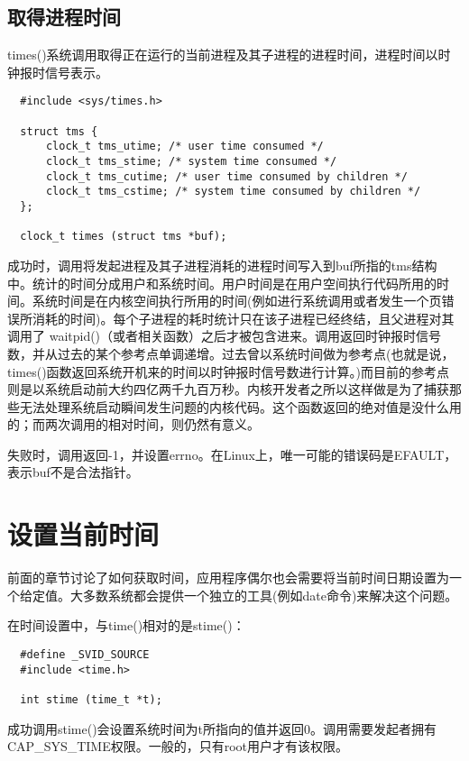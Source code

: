 \subsection{取得进程时间}

times()系统调用取得正在运行的当前进程及其子进程的进程时间，进程时间以时钟报时信号表示。 

\begin{lstlisting}
  #include <sys/times.h>

  struct tms {
      clock_t tms_utime; /* user time consumed */
      clock_t tms_stime; /* system time consumed */
      clock_t tms_cutime; /* user time consumed by children */
      clock_t tms_cstime; /* system time consumed by children */
  };

  clock_t times (struct tms *buf);
\end{lstlisting}

成功时，调用将发起进程及其子进程消耗的进程时间写入到buf所指的tms结构中。统计的时间分成用户和系统时间。用户时间是在用户空间执行代码所用的时间。系统时间是在内核空间执行所用的时间(例如进行系统调用或者发生一个页错误所消耗的时间)。每个子进程的耗时统计只在该子进程已经终结，且父进程对其调用了 waitpid()（或者相关函数）之后才被包含进来。调用返回时钟报时信号数，并从过去的某个参考点单调递增。过去曾以系统时间做为参考点(也就是说，times()函数返回系统开机来的时间以时钟报时信号数进行计算。)而目前的参考点则是以系统启动前大约四亿两千九百万秒。内核开发者之所以这样做是为了捕获那些无法处理系统启动瞬间发生问题的内核代码。这个函数返回的绝对值是没什么用的；而两次调用的相对时间，则仍然有意义。

失败时，调用返回-1，并设置errno。在Linux上，唯一可能的错误码是EFAULT，表示buf不是合法指针。 

\section{设置当前时间}

前面的章节讨论了如何获取时间，应用程序偶尔也会需要将当前时间日期设置为一个给定值。大多数系统都会提供一个独立的工具(例如date命令)来解决这个问题。

在时间设置中，与time()相对的是stime()： 

\begin{lstlisting}
  #define _SVID_SOURCE
  #include <time.h>

  int stime (time_t *t);
\end{lstlisting}

成功调用stime()会设置系统时间为t所指向的值并返回0。调用需要发起者拥有CAP\_SYS\_TIME权限。一般的，只有root用户才有该权限。

